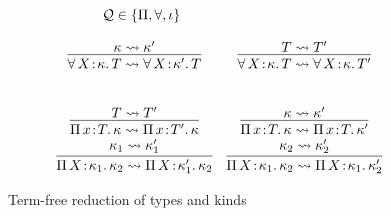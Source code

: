 \documentclass{article}
\newcommand{\abs}[4]{{#1}\, #2\! : \! #3.\, #4}
\begin{document}
\begin{figure}
\[\begin{array}{c}
\begin{array}{cc}
{         \quad \mathcal{Q} \in \{\Pi,\forall,\iota\}
        }
        \\ \\
          \infer{
           \abs{\forall}{X}{\kappa}{T}
           \rightsquigarrow
           \abs{\forall}{X}{\kappa'}{T}
          }{
           \kappa \rightsquigarrow \kappa'
          }
        & 
        \infer{
         \abs{\forall}{X}{\kappa}{T}
         \rightsquigarrow
         \abs{\forall}{X}{\kappa}{T'}
        }{
         T \rightsquigarrow T'
        }
        \\ \\ \\
        \infer{
         \abs{\Pi}{x}{T}{\kappa}
         \rightsquigarrow
         \abs{\Pi}{x}{T'}{\kappa}
        }{
         T \rightsquigarrow T'
        }
        &
          \infer{
           \abs{\Pi}{x}{T}{\kappa}
           \rightsquigarrow
           \abs{\Pi}{x}{T}{\kappa'}
          }{
           \kappa \rightsquigarrow \kappa'
          }
        \\
        \infer{
         \abs{\Pi}{X}{\kappa_1}{\kappa_2}
         \rightsquigarrow
         \abs{\Pi}{X}{\kappa_1'}{\kappa_2}
        }{
         \kappa_1 \rightsquigarrow \kappa_1'
        }
        &
          \infer{
           \abs{\Pi}{X}{\kappa_1}{\kappa_2}
           \rightsquigarrow
           \abs{\Pi}{X}{\kappa_1}{\kappa_2'}
          }{
           \kappa_2 \rightsquigarrow \kappa_2'
          }
      \end{array}
    \end{array}
  \]
  \caption{Term-free reduction of types and kinds}
  \label{fig:tp-reduce}
\end{figure}
\end{document}
